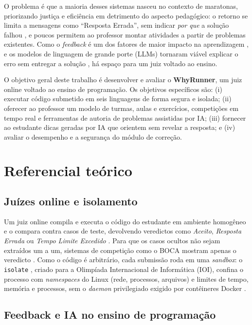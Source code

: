 \documentclass[12pt]{article}
\begin{document}
O problema é que a maioria desses sistemas nasceu no contexto de maratonas, priorizando justiça e eficiência em detrimento do aspecto pedagógico: o retorno se limita a mensagens como ``Resposta Errada'', sem indicar \emph{por que} a solução falhou \cite{keuning2018systematic}, e poucos permitem ao professor montar atividades a partir de problemas existentes. Como o \emph{feedback} é um dos fatores de maior impacto na aprendizagem \cite{hattie2007power}, e os modelos de linguagem de grande porte (LLMs) tornaram viável explicar o erro sem entregar a solução \cite{liffiton2023codehelp,kazemitabaar2024codeaid}, há espaço para um juiz voltado ao ensino.

O objetivo geral deste trabalho é desenvolver e avaliar o \textbf{WhyRunner}, um juiz online voltado ao ensino de programação. Os objetivos específicos são: (i) executar código submetido em seis linguagens de forma segura e isolada; (ii) oferecer ao professor um modelo de turmas, aulas e exercícios, competições em tempo real e ferramentas de autoria de problemas assistidas por IA; (iii) fornecer ao estudante dicas geradas por IA que orientem sem revelar a resposta; e (iv) avaliar o desempenho e a segurança do módulo de correção.

\section{Referencial teórico}\label{sec:referencial}

\subsection{Juízes online e isolamento}

Um juiz online compila e executa o código do estudante em ambiente homogêneo e o compara contra casos de teste, devolvendo veredictos como \emph{Aceito}, \emph{Resposta Errada} ou \emph{Tempo Limite Excedido} \cite{wasik2018survey}. Para que os casos ocultos não sejam extraídos um a um, sistemas de competição como o BOCA mostram apenas o veredicto \cite{de2004boca}. Como o código é arbitrário, cada submissão roda em uma \emph{sandbox}: o \texttt{isolate} \cite{mares2012isolate}, criado para a Olimpíada Internacional de Informática (IOI), confina o processo com \emph{namespaces} do Linux (rede, processos, arquivos) e limites de tempo, memória e processos, sem o \emph{daemon} privilegiado exigido por contêineres Docker \cite{merkel2014docker}.

\subsection{Feedback e IA no ensino de programação}
\end{document}
